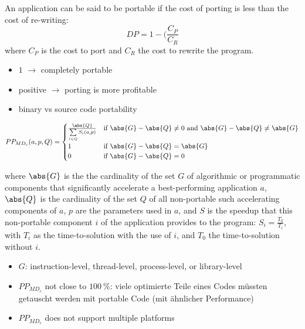 \begin{definition}
An application can be said to be portable if the cost of porting is less than the cost of re-writing:
$$DP = 1 - (\frac{C_P}{C_R}$$
where $C_P$ is the cost to port and $C_R$ the cost to rewrite the program. 
\end{definition}

\begin{itemize}
    \item $1$ $\rightarrow$ completely portable
    \item positive $\rightarrow$ porting is more profitable
    \item binary vs source code portability
\end{itemize}

\begin{definition}

$$PP_{MD_c}(a, p, Q) = 
    \begin{cases}
        \frac{\abs{Q}}{\sum\limits_{i \in Q} S_i(a, p)} & \text{if }\abs{G} - \abs{Q} \neq 0\text{ and }\abs{G} - \abs{Q} \neq \abs{G} \\
        1  & \text{if }\abs{G} - \abs{Q} = \abs{G}\\
        0  & \text{if }\abs{G} - \abs{Q} = 0
    \end{cases}
$$

where $\abs{G}$ is the the cardinality of the set $G$ of algorithmic or programmatic components that significantly accelerate a best-performing application $a$, $\abs{Q}$ is the cardinality of the set $Q$ of all non-portable such accelerating components of $a$, $p$ are the parameters used in $a$, and $S$ is the speedup that this non-portable component $i$ of the application provides to the program: $S_i = \frac{T_0}{T_i}$, with $T_i$ as the time-to-solution with the use of $i$, and $T_0$ the time-to-solution without $i$.
\end{definition}

\begin{itemize}
    \item $G$: instruction-level, thread-level, process-level, or library-level
    \item $PP_{MD_c}$ not close to $\SI{100}{\percent}$: viele optimierte Teile eines Codes müssten getauscht werden mit portable Code (mit ähnlicher Performance)
    \item $PP_{MD_c}$ does not support multiple platforms
\end{itemize}

